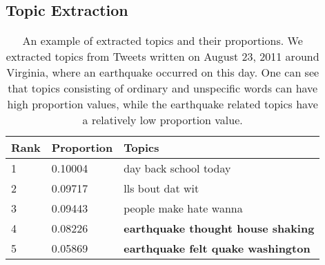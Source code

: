 \subsection{Topic Extraction}
\label{subsec:topic_extraction}

\begin{table}[b]%
\begin{center}
\begin{tabular}{|l|l|l|}
	\hline
	 Rank & Proportion & Topics \\
	\hline\hline
	1 & 0.10004  & day back school today \\ %
	2 & 0.09717	 & lls bout dat wit \\ %
	3  & 0.09443 & people make hate wanna \\ %
	4 & 0.08226 & \textbf{earthquake thought house shaking} \\ %
	5 & 0.05869 & \textbf{earthquake felt quake washington} \\ %
	\hline
\end{tabular}
\caption{An example of extracted topics and their proportions.
We extracted topics from Tweets written on August 23, 2011 around Virginia, 
where an earthquake occurred on this day.
One can see that topics consisting of ordinary and unspecific words can have high proportion values,
while the earthquake related topics have a relatively low proportion value.}
\label{T:TopicProportion}
\end{center}
\end{table}


